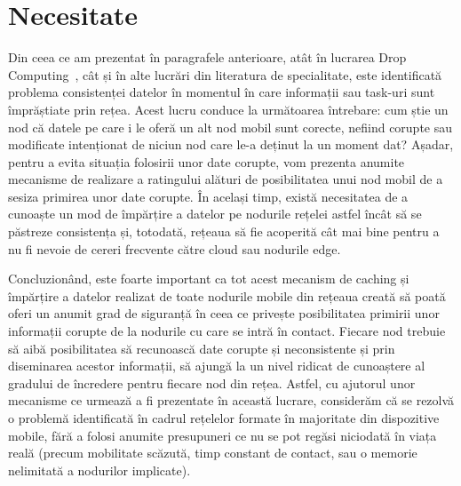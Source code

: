 \documentclass[12pt,a4paper]{report}
\begin{document}
\section{Necesitate}
Din ceea ce am prezentat în paragrafele anterioare, atât în lucrarea Drop Computing~\cite{DC}, cât și în alte lucrări din literatura de specialitate, este identificată problema consistenței datelor în momentul în care informații sau task-uri sunt împrăștiate prin rețea. Acest lucru conduce la următoarea întrebare: cum știe un nod că datele pe care i le oferă un alt nod mobil sunt corecte, nefiind corupte sau modificate intenționat de niciun nod care le-a deținut la un moment dat? Așadar, pentru a evita situația folosirii unor date corupte, vom prezenta anumite mecanisme de realizare a ratingului alături de posibilitatea unui nod mobil de a sesiza primirea unor date corupte. În același timp, există necesitatea de a cunoaște un mod de împărțire a datelor pe nodurile rețelei astfel încât să se păstreze consistența și, totodată, rețeaua să fie acoperită cât mai bine pentru a nu fi nevoie de cereri frecvente către cloud sau nodurile edge.

Concluzionând, este foarte important ca tot acest mecanism de caching și împărțire a datelor realizat de toate nodurile mobile din rețeaua creată să poată oferi un anumit grad de siguranță în ceea ce privește posibilitatea primirii unor informații corupte de la nodurile cu care se intră în contact. Fiecare nod trebuie să aibă posibilitatea să recunoască date corupte și neconsistente și prin diseminarea acestor informații, să ajungă la un nivel ridicat de cunoaștere al gradului de încredere pentru fiecare nod din rețea. Astfel, cu ajutorul unor mecanisme ce urmează a fi prezentate în această lucrare, considerăm că se rezolvă o problemă identificată în cadrul rețelelor formate în majoritate din dispozitive mobile, fără a folosi anumite presupuneri ce nu se pot regăsi niciodată în viața reală (precum mobilitate scăzută, timp constant de contact, sau o memorie nelimitată a nodurilor implicate).
\end{document}
